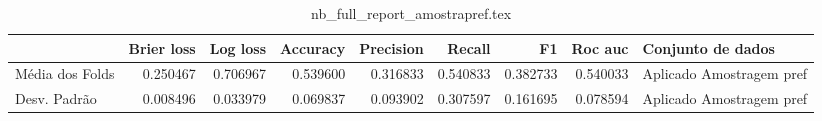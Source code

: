 \begin{table}
\centering
\caption{nb_full_report_amostrapref.tex}
\label{nb_full_report_amostrapref.tex}
\begin{tabular}{lrrrrrrrl}
\toprule
{} &  Brier  loss &  Log loss &  Accuracy  &  Precision  &   Recall  &       F1  &  Roc auc  &         Conjunto de dados \\
\midrule
Média dos Folds &     0.250467 &  0.706967 &   0.539600 &    0.316833 &  0.540833 &  0.382733 &  0.540033 &  Aplicado Amostragem pref \\
Desv. Padrão    &     0.008496 &  0.033979 &   0.069837 &    0.093902 &  0.307597 &  0.161695 &  0.078594 &  Aplicado Amostragem pref \\
\bottomrule
\end{tabular}
\end{table}
